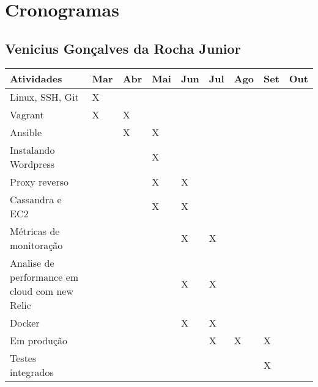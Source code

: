 \chapter{Cronogramas}
\section{Venicius Gonçalves da Rocha Junior}

\begin{center}
\begin{tabular}{ | m{20em} | m{0.5cm}| m{0.5cm} |
m{0.5cm} | m{0.5cm} |
m{0.5cm} |m{0.5cm} |m{0.5cm} |m{0.5cm} | }
\hline
 Atividades & Mar & Abr & Mai & Jun &
 Jul & Ago & Set & Out \\
\hline
Linux, SSH, Git & X & & & & & & &  \\
\hline
Vagrant & X & X & & & & & & \\
\hline
Ansible &  & X & X & & & & & \\
\hline
Instalando Wordpress &  & & X & & & & & \\
\hline
Proxy reverso &  & & X & X & & & & \\
\hline
Cassandra e EC2 &  & & X & X & & & & \\
\hline
Métricas de monitoração &  & & & X & X & & & \\
\hline
Analise de performance em cloud com new Relic &  & & & X & X & & & \\
\hline
Docker &  & & & X & X & & & \\
\hline
Em produção &  & & &  & X & X & X & \\
\hline
Testes integrados & & & & & & & X & \\




\hline
\end{tabular}
\end{center}

